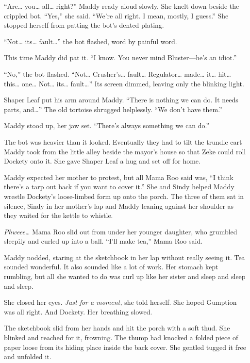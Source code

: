 \documentclass[10pt]{article}
\begin{document}
``Are\ldots{} you\ldots{} all\ldots{} right?'' Maddy ready aloud slowly.
She knelt down beside the crippled bot. ``Yes,'' she said. ``We're all
right. I mean, mostly, I guess.'' She stopped herself from patting the
bot's dented plating.

``Not\ldots{} its\ldots{} fault\ldots{}'' the bot flashed, word by
painful word.

This time Maddy did pat it. ``I know. You never mind Bluster---he's an
idiot.''

``No,'' the bot flashed. ``Not\ldots{} Crusher's\ldots{} fault\ldots{}
Regulator\ldots{} made\ldots{} it\ldots{} hit\ldots{} this\ldots{}
one\ldots{} Not\ldots{} its\ldots{} fault\ldots{}'' Its screen dimmed,
leaving only the blinking light.

Shaper Leaf put his arm around Maddy. ``There is nothing we can do. It
needs parts, and\ldots{}'' The old tortoise shrugged helplessly. ``We
don't have them.''

Maddy stood up, her jaw set. ``There's always something we can do.''

The bot was heavier than it looked. Eventually they had to tilt the
trundle cart Maddy took from the little alley beside the mayor's house
so that Zeke could roll Dockety onto it. She gave Shaper Leaf a hug and
set off for home.

Maddy expected her mother to protest, but all Mama Roo said was, ``I
think there's a tarp out back if you want to cover it.'' She and Sindy
helped Maddy wrestle Dockety's loose-limbed form up onto the porch. The
three of them sat in silence, Sindy in her mother's lap and Maddy
leaning against her shoulder as they waited for the kettle to whistle.

\emph{Phweee\ldots{}} Mama Roo slid out from under her younger daughter,
who grumbled sleepily and curled up into a ball. ``I'll make tea,'' Mama
Roo said.

Maddy nodded, staring at the sketchbook in her lap without really seeing
it. Tea sounded wonderful. It also sounded like a lot of work. Her
stomach kept rumbling, but all she wanted to do was curl up like her
sister and sleep and sleep and sleep.

She closed her eyes. \emph{Just for a moment,} she told herself. She
hoped Gumption was all right. And Dockety. Her breathing slowed.

The sketchbook slid from her hands and hit the porch with a soft thud.
She blinked and reached for it, frowning. The thump had knocked a folded
piece of paper loose from its hiding place inside the back cover. She
gentled tugged it free and unfolded it.
\end{document}
